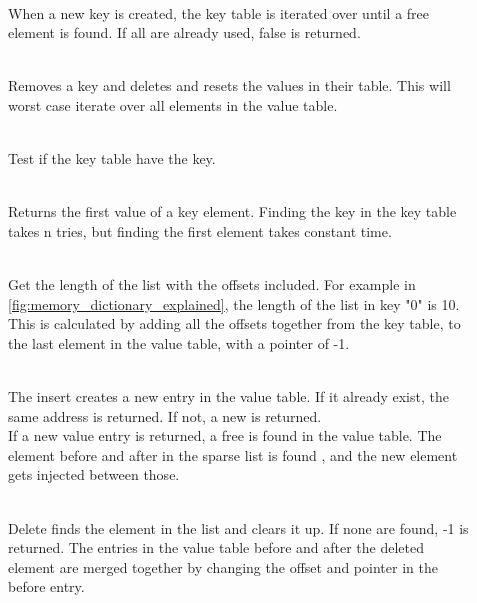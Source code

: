 \begin{description}
  \item[]\hfill\\
  When a new key is created, the key table is iterated over until a free element
  is found. If all are already used, false is returned.

  \item[]\hfill\\
  Removes a key and deletes and resets the values in their table. This will
  worst case iterate over all elements in the value table.

  \item[]\hfill\\
  Test if the key table have the key.

  \item[]\hfill\\
  Returns the first value of a key element. Finding the key in the key table takes
  n tries, but finding the first element takes constant time.

  \item[]\hfill\\
  Get the length of the list with the offsets included. For example in
  \autoref{fig:memory_dictionary_explained}, the length of the list in
    key "0" is 10. This is calculated by adding all
    the offsets together from the key table, to the last element in the
    value table, with a pointer of -1.

  \item[]\hfill\\
  The insert creates a new entry in the value table. If it already exist, the
  same address is returned. If not, a new is returned. \\
  If a new value entry is returned, a free is found in the value table.
  The element before and after in the sparse list is found , and the new element
  gets injected between those.

  \item[]\hfill\\
  Delete finds the element in the list and clears it up. If none are found, -1 is
  returned. The entries in the value table before and after the deleted element
  are merged together by changing the offset and pointer in the before entry.



\end{description}
